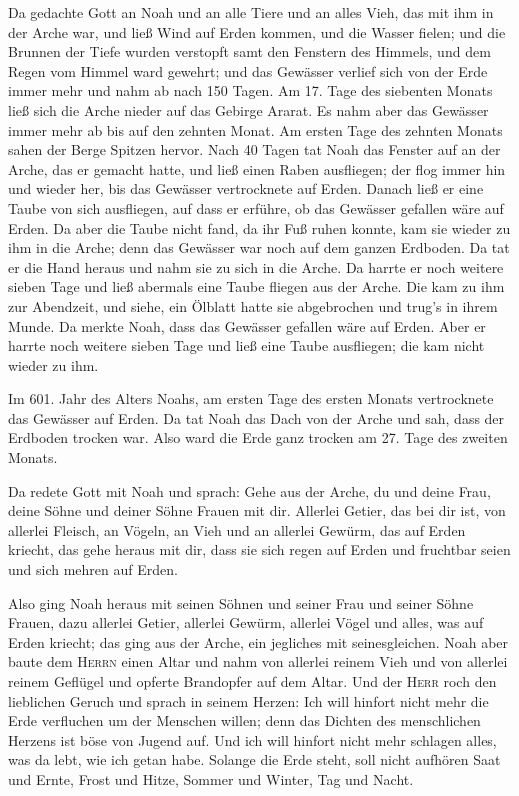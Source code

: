  Da gedachte Gott an Noah und an alle Tiere und an alles
Vieh, das mit ihm in der Arche war, und ließ Wind auf Erden kommen, und
die Wasser fielen;  und die Brunnen der Tiefe wurden
verstopft samt den Fenstern des Himmels, und dem Regen vom Himmel ward
gewehrt;  und das Gewässer verlief sich von der Erde immer
mehr und nahm ab nach 150 Tagen.  Am 17. Tage des
siebenten Monats ließ sich die Arche nieder auf das Gebirge Ararat.
 Es nahm aber das Gewässer immer mehr ab bis auf den
zehnten Monat. Am ersten Tage des zehnten Monats sahen der Berge Spitzen
hervor.  Nach 40 Tagen tat Noah das Fenster auf an der
Arche, das er gemacht hatte,  und ließ einen Raben
ausfliegen; der flog immer hin und wieder her, bis das Gewässer
vertrocknete auf Erden.  Danach ließ er eine Taube von
sich ausfliegen, auf dass er erführe, ob das Gewässer gefallen wäre auf
Erden.  Da aber die Taube nicht fand, da ihr Fuß ruhen
konnte, kam sie wieder zu ihm in die Arche; denn das Gewässer war noch
auf dem ganzen Erdboden. Da tat er die Hand heraus und nahm sie zu sich
in die Arche.  Da harrte er noch weitere sieben Tage und
ließ abermals eine Taube fliegen aus der Arche.  Die kam
zu ihm zur Abendzeit, und siehe, ein Ölblatt hatte sie abgebrochen und
trug's in ihrem Munde. Da merkte Noah, dass das Gewässer gefallen wäre
auf Erden.  Aber er harrte noch weitere sieben Tage und
ließ eine Taube ausfliegen; die kam nicht wieder zu ihm.

 Im 601. Jahr des Alters Noahs, am ersten Tage des ersten
Monats vertrocknete das Gewässer auf Erden. Da tat Noah das Dach von der
Arche und sah, dass der Erdboden trocken war.  Also ward
die Erde ganz trocken am 27. Tage des zweiten Monats.

 Da redete Gott mit Noah und sprach:  Gehe
aus der Arche, du und deine Frau, deine Söhne und deiner Söhne Frauen
mit dir.  Allerlei Getier, das bei dir ist, von allerlei
Fleisch, an Vögeln, an Vieh und an allerlei Gewürm, das auf Erden
kriecht, das gehe heraus mit dir, dass sie sich regen auf Erden und
fruchtbar seien und sich mehren auf Erden.

 Also ging Noah heraus mit seinen Söhnen und seiner Frau
und seiner Söhne Frauen,  dazu allerlei Getier, allerlei
Gewürm, allerlei Vögel und alles, was auf Erden kriecht; das ging aus
der Arche, ein jegliches mit seinesgleichen.  Noah aber
baute dem \textsc{Herrn} einen Altar und nahm von allerlei reinem Vieh
und von allerlei reinem Geflügel und opferte Brandopfer auf dem Altar.
 Und der \textsc{Herr} roch den lieblichen Geruch und
sprach in seinem Herzen: Ich will hinfort nicht mehr die Erde verfluchen
um der Menschen willen; denn das Dichten des menschlichen Herzens ist
böse von Jugend auf. Und ich will hinfort nicht mehr schlagen alles, was
da lebt, wie ich getan habe.  Solange die Erde steht,
soll nicht aufhören Saat und Ernte, Frost und Hitze, Sommer und Winter,
Tag und Nacht.

